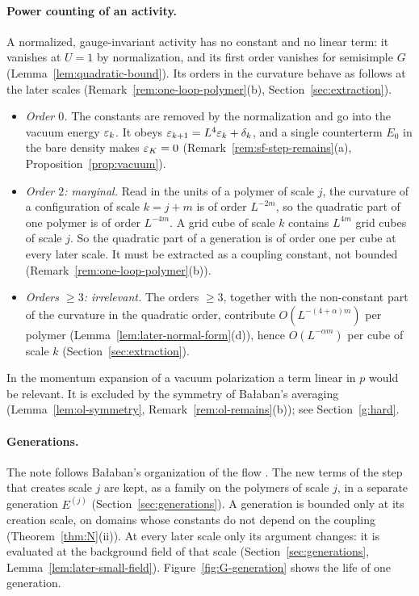 \paragraph{Power counting of an activity.} A normalized, gauge-invariant activity has no constant and no linear term: it vanishes at $U=1$ by normalization, and its first order vanishes for semisimple $G$ (Lemma~\ref{lem:quadratic-bound}). Its orders in the curvature behave as follows at the later scales (Remark~\ref{rem:one-loop-polymer}(b), Section~\ref{sec:extraction}).
\begin{itemize}
\item \emph{Order $0$.} The constants are removed by the normalization and go into the vacuum energy $\varepsilon_k$. It obeys $\varepsilon_{k+1}=L^4\varepsilon_k+\delta_k$, and a single counterterm $E_0$ in the bare density makes $\varepsilon_K=0$ (Remark~\ref{rem:sf-step-remains}(a), Proposition~\ref{prop:vacuum}).
\item \emph{Order $2$: marginal.} Read in the units of a polymer of scale $j$, the curvature of a configuration of scale $k=j+m$ is of order $L^{-2m}$, so the quadratic part of one polymer is of order $L^{-4m}$. A grid cube of scale $k$ contains $L^{4m}$ grid cubes of scale $j$. So the quadratic part of a generation is of order one per cube at every later scale. It must be extracted as a coupling constant, not bounded (Remark~\ref{rem:one-loop-polymer}(b)).
\item \emph{Orders $\ge3$: irrelevant.} The orders $\ge3$, together with the non-constant part of the curvature in the quadratic order, contribute $O(L^{-(4+\alpha)m})$ per polymer (Lemma~\ref{lem:later-normal-form}(d)), hence $O(L^{-\alpha m})$ per cube of scale $k$ (Section~\ref{sec:extraction}).
\end{itemize}
In the momentum expansion of a vacuum polarization a term linear in $p$ would be relevant. It is excluded by the symmetry of Ba\l aban's averaging (Lemma~\ref{lem:ol-symmetry}, Remark~\ref{rem:ol-remains}(b)); see Section~\ref{g:hard}.

\paragraph{Generations.} The note follows Ba\l aban's organization of the flow \cite[(0.22)--(0.30)]{BalYM4I}. The new terms of the step that creates scale $j$ are kept, as a family on the polymers of scale $j$, in a separate generation $E^{(j)}$ (Section~\ref{sec:generations}). A generation is bounded only at its creation scale, on domains whose constants do not depend on the coupling (Theorem~\ref{thm:N}(ii)). At every later scale only its argument changes: it is evaluated at the background field of that scale (Section~\ref{sec:generations}, Lemma~\ref{lem:later-small-field}). Figure~\ref{fig:G-generation} shows the life of one generation.

